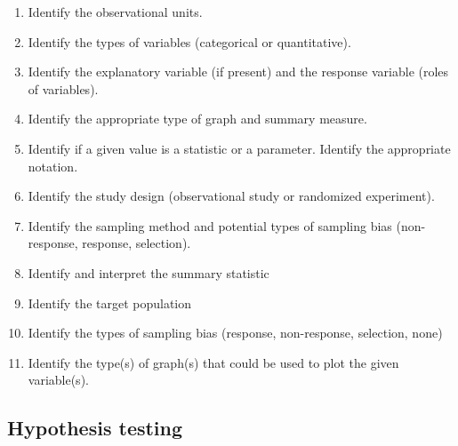 \documentclass[
]{report}
\newcounter{none} %
\begin{document}
\begin{enumerate}
\def\labelenumi{\arabic{enumi}.}
\item
  Identify the observational units.
\item
  Identify the types of variables (categorical or quantitative).
\item
  Identify the explanatory variable (if present) and the response variable (roles of variables).
\item
  Identify the appropriate type of graph and summary measure.
\item
  Identify if a given value is a statistic or a parameter. Identify the appropriate notation.
\item
  Identify the study design (observational study or randomized experiment).
\item
  Identify the sampling method and potential types of sampling bias (non-response, response, selection).
\item
  Identify and interpret the summary statistic
\item
  Identify the target population
\item
  Identify the types of sampling bias (response, non-response, selection, none)
\item
  Identify the type(s) of graph(s) that could be used to plot the given variable(s).
\end{enumerate}

\subsection*{Hypothesis testing}\label{hypothesis-testing}
\end{document}
